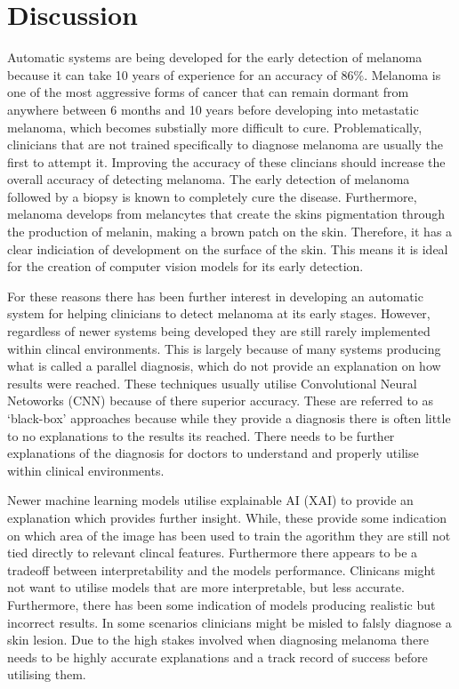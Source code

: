 \section{Discussion}
Automatic systems are being developed for the early detection of melanoma because it can take 10 years of experience for an accuracy of 86\%\cite{Morton1998}. Melanoma is one of the most aggressive forms of cancer that can remain dormant from anywhere between 6 months and 10 years before developing into metastatic melanoma, which becomes substially more difficult to cure\cite{UK2019}. Problematically, clinicians that are not trained specifically to diagnose melanoma are usually the first to attempt it. Improving the accuracy of these clincians should increase the overall accuracy of detecting melanoma. The early detection of melanoma followed by a biopsy is known to completely cure the disease\cite{}. Furthermore, melanoma develops from melancytes that create the skins pigmentation through the production of melanin, making a brown patch on the skin. Therefore, it has a clear indiciation of development on the surface of the skin. This means it is ideal for the creation of computer vision models for its early detection.

For these reasons there has been further interest in developing an automatic system for helping clinicians to detect melanoma at its early stages. However, regardless of newer systems being developed they are still rarely implemented within clincal environments. This is largely because of many systems producing what is called a parallel diagnosis, which do not provide an explanation on how results were reached\cite{Lipton2018}. These techniques usually utilise Convolutional Neural Netoworks (CNN) because of there superior accuracy\cite{Wen2022}. These are referred to as `black-box' approaches because while they provide a diagnosis there is often little to no explanations to the results its reached\cite{Andre2017}. There needs to be further explanations of the diagnosis for doctors to understand and properly utilise within clinical environments. 

Newer machine learning models utilise explainable AI (XAI) to provide an explanation which provides further insight\cite{skar2017}. While, these provide some indication on which area of the image has been used to train the agorithm they are still not tied directly to relevant clincal features. Furthermore there appears to be a tradeoff between interpretability and the models performance. Clinicans might not want to utilise models that are more interpretable, but less accurate. Furthermore, there has been some indication of models producing realistic but incorrect results\cite{Lipton2018}. In some scenarios clinicians might be misled to falsly diagnose a skin lesion. Due to the high stakes involved when diagnosing melanoma there needs to be highly accurate explanations and a track record of success before utilising them.

